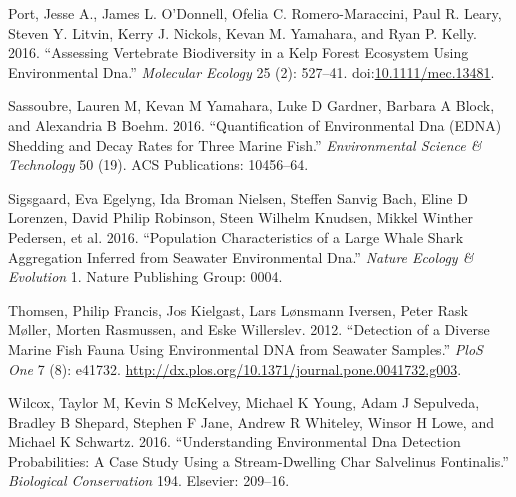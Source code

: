 \documentclass[fleqn,10pt,lineno]{wlpeerj} %
\begin{document}
\hypertarget{ref-MEC:MEC13481}{}
Port, Jesse A., James L. O'Donnell, Ofelia C. Romero-Maraccini, Paul R.
Leary, Steven Y. Litvin, Kerry J. Nickols, Kevan M. Yamahara, and Ryan
P. Kelly. 2016. ``Assessing Vertebrate Biodiversity in a Kelp Forest
Ecosystem Using Environmental Dna.'' \emph{Molecular Ecology} 25 (2):
527--41.
doi:\href{https://doi.org/10.1111/mec.13481}{10.1111/mec.13481}.

\hypertarget{ref-sassoubre2016quantification}{}
Sassoubre, Lauren M, Kevan M Yamahara, Luke D Gardner, Barbara A Block,
and Alexandria B Boehm. 2016. ``Quantification of Environmental Dna
(EDNA) Shedding and Decay Rates for Three Marine Fish.''
\emph{Environmental Science \& Technology} 50 (19). ACS Publications:
10456--64.

\hypertarget{ref-sigsgaard2016population}{}
Sigsgaard, Eva Egelyng, Ida Broman Nielsen, Steffen Sanvig Bach, Eline D
Lorenzen, David Philip Robinson, Steen Wilhelm Knudsen, Mikkel Winther
Pedersen, et al. 2016. ``Population Characteristics of a Large Whale
Shark Aggregation Inferred from Seawater Environmental Dna.''
\emph{Nature Ecology \& Evolution} 1. Nature Publishing Group: 0004.

\hypertarget{ref-thomsen_detection_2012}{}
Thomsen, Philip Francis, Jos Kielgast, Lars Lønsmann Iversen, Peter Rask
Møller, Morten Rasmussen, and Eske Willerslev. 2012. ``Detection of a
Diverse Marine Fish Fauna Using Environmental DNA from Seawater
Samples.'' \emph{PloS One} 7 (8): e41732.
\url{http://dx.plos.org/10.1371/journal.pone.0041732.g003}.

\hypertarget{ref-wilcox2016understanding}{}
Wilcox, Taylor M, Kevin S McKelvey, Michael K Young, Adam J Sepulveda,
Bradley B Shepard, Stephen F Jane, Andrew R Whiteley, Winsor H Lowe, and
Michael K Schwartz. 2016. ``Understanding Environmental Dna Detection
Probabilities: A Case Study Using a Stream-Dwelling Char Salvelinus
Fontinalis.'' \emph{Biological Conservation} 194. Elsevier: 209--16.
\end{document}
